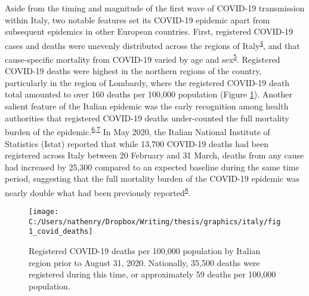 \documentclass[
]{article}
\begin{document}
Aside from the timing and magnitude of the first wave of COVID-19 transmission within Italy, two notable features set its COVID-19 epidemic apart from subsequent epidemics in other European countries. First, registered COVID-19 cases and deaths were unevenly distributed across the regions of Italy\textsuperscript{\protect\hyperlink{ref-LaMaestra2020}{4}}⁠, and that cause-specific mortality from COVID-19 varied by age and sex\textsuperscript{\protect\hyperlink{ref-Albitar2020}{5}}⁠. Registered COVID-19 deaths were highest in the northern regions of the country, particularly in the region of Lombardy, where the registered COVID-19 death total amounted to over 160 deaths per 100,000 population (Figure \ref{fig:covid-deaths}). Another salient feature of the Italian epidemic was the early recognition among health authorities that registered COVID-19 deaths under-counted the full mortality burden of the epidemic.\textsuperscript{\protect\hyperlink{ref-Vestergaard2020}{6},\protect\hyperlink{ref-Pasquariello2020}{7}} In May 2020, the Italian National Institute of Statistics (Istat) reported that while 13,700 COVID-19 deaths had been registered across Italy between 20 February and 31 March, deaths from any cause had increased by 25,300 compared to an expected baseline during the same time period, suggesting that the full mortality burden of the COVID-19 epidemic was nearly double what had been previously reported\textsuperscript{\protect\hyperlink{ref-Mannucci2020}{8}}.

\begin{figure}[!hbt]

{\centering \texttt{[image: C:/Users/nathenry/Dropbox/Writing/thesis/graphics/italy/fig1\_covid\_deaths]} 

}

\caption{Registered COVID-19 deaths per 100,000 population by Italian region prior to August 31, 2020. Nationally, 35,500 deaths were registered during this time, or approximately 59 deaths per 100,000 population.}\label{fig:covid-deaths}
\end{figure}
\end{document}
